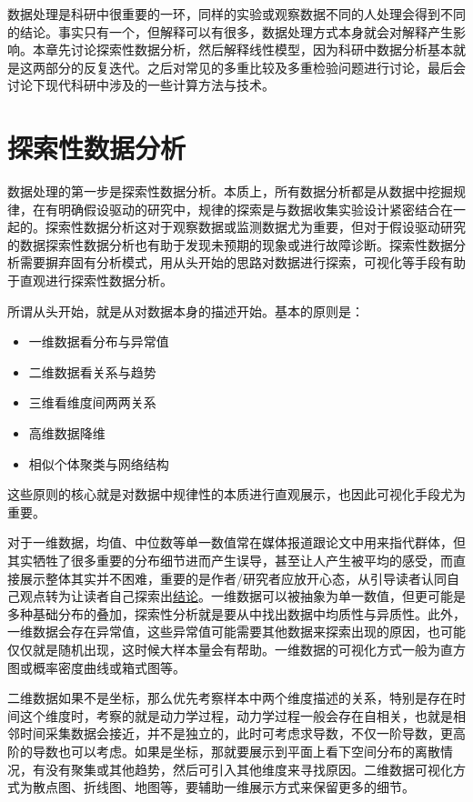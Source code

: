 \documentclass[]{tufte-book}
\providecommand{\tightlist}{%
  \setlength{\itemsep}{0pt}\setlength{\parskip}{0pt}}
\begin{document}
数据处理是科研中很重要的一环，同样的实验或观察数据不同的人处理会得到不同的结论。事实只有一个，但解释可以有很多，数据处理方式本身就会对解释产生影响。本章先讨论探索性数据分析，然后解释线性模型，因为科研中数据分析基本就是这两部分的反复迭代。之后对常见的多重比较及多重检验问题进行讨论，最后会讨论下现代科研中涉及的一些计算方法与技术。

\hypertarget{ux63a2ux7d22ux6027ux6570ux636eux5206ux6790}{%
\section{探索性数据分析}\label{ux63a2ux7d22ux6027ux6570ux636eux5206ux6790}}

数据处理的第一步是探索性数据分析。本质上，所有数据分析都是从数据中挖掘规律，在有明确假设驱动的研究中，规律的探索是与数据收集实验设计紧密结合在一起的。探索性数据分析这对于观察数据或监测数据尤为重要，但对于假设驱动研究的数据探索性数据分析也有助于发现未预期的现象或进行故障诊断。探索性数据分析需要摒弃固有分析模式，用从头开始的思路对数据进行探索，可视化等手段有助于直观进行探索性数据分析。

所谓从头开始，就是从对数据本身的描述开始。基本的原则是：

\begin{itemize}
\tightlist
\item
  一维数据看分布与异常值
\item
  二维数据看关系与趋势
\item
  三维看维度间两两关系
\item
  高维数据降维
\item
  相似个体聚类与网络结构
\end{itemize}

这些原则的核心就是对数据中规律性的本质进行直观展示，也因此可视化手段尤为重要。

对于一维数据，均值、中位数等单一数值常在媒体报道跟论文中用来指代群体，但其实牺牲了很多重要的分布细节进而产生误导，甚至让人产生被平均的感受，而直接展示整体其实并不困难，重要的是作者/研究者应放开心态，从引导读者认同自己观点转为让读者自己探索出\href{http://flowingdata.com/2017/07/07/small-summary-stats/}{结论}。一维数据可以被抽象为单一数值，但更可能是多种基础分布的叠加，探索性分析就是要从中找出数据中均质性与异质性。此外，一维数据会存在异常值，这些异常值可能需要其他数据来探索出现的原因，也可能仅仅就是随机出现，这时候大样本量会有帮助。一维数据的可视化方式一般为直方图或概率密度曲线或箱式图等。

二维数据如果不是坐标，那么优先考察样本中两个维度描述的关系，特别是存在时间这个维度时，考察的就是动力学过程，动力学过程一般会存在自相关，也就是相邻时间采集数据会接近，并不是独立的，此时可考虑求导数，不仅一阶导数，更高阶的导数也可以考虑。如果是坐标，那就要展示到平面上看下空间分布的离散情况，有没有聚集或其他趋势，然后可引入其他维度来寻找原因。二维数据可视化方式为散点图、折线图、地图等，要辅助一维展示方式来保留更多的细节。
\end{document}
